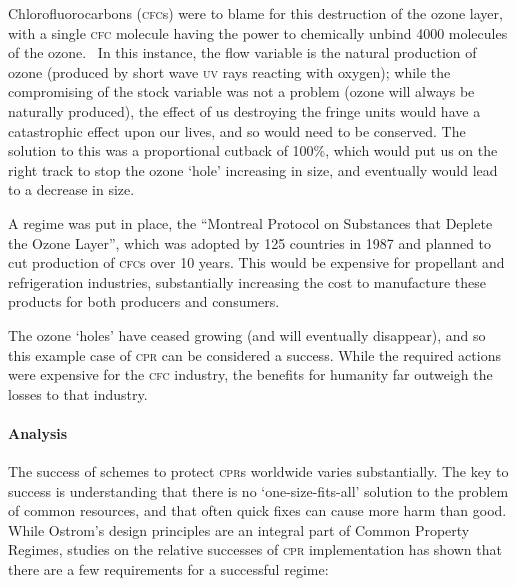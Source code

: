 \documentclass[]{article} %
\begin{document}
Chlorofluorocarbons (\textsc{cfc}s) were to blame for this destruction of the ozone layer, with a single \textsc{cfc} molecule having the power to chemically unbind 4000 molecules of the ozone.~\cite{Canada-sea-law} In this instance, the flow variable is the natural production of ozone (produced by short wave \textsc{uv} rays reacting with oxygen); while the compromising of the stock variable was not a problem (ozone will always be naturally produced), the effect of us destroying the fringe units would have a catastrophic effect upon our lives, and so would need to be conserved. The solution to this was a proportional cutback of 100\%, which would put us on the right track to stop the ozone ‘hole’ increasing in size, and eventually would lead to a decrease in size.

A regime was put in place, the “Montreal Protocol on Substances that Deplete the Ozone Layer”, which was adopted by 125 countries in 1987 and planned to cut production of \textsc{cfc}s over 10 years. This would be expensive for propellant and refrigeration industries, substantially increasing the cost to manufacture these products for both producers and consumers.

The ozone ‘holes’ have ceased growing (and will eventually disappear), and so this example case of \textsc{cpr} can be considered a success. While the required actions were expensive for the \textsc{cfc} industry, the benefits for humanity far outweigh the losses to that industry.

\paragraph{Analysis}

The success of schemes to protect \textsc{cpr}s worldwide varies substantially. The key to success is understanding that there is no ‘one-size-fits-all’ solution to the problem of common resources, and that often quick fixes can cause more harm than good. While Ostrom’s design principles are an integral part of Common Property Regimes, studies on the relative successes of \textsc{cpr} implementation has shown that there are a few requirements for a successful regime:~\cite{Ostrom-challenge-90}
\end{document}
